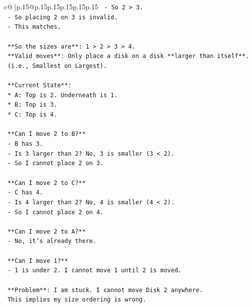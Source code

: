 \documentclass{article}
\begin{document}
{\begin{supertabular}{c@{$\;$}|p{.15\linewidth}@{}p{.15\linewidth}p{.15\linewidth}p{.15\linewidth}p{.15\linewidth}p{.15\linewidth}}
{{{\texttt{                   {-} So 2 > 3.} \\
\texttt{                   {-} So placing 2 on 3 is invalid.} \\
\texttt{                   {-} This matches.} \\
\\ 
\texttt{                **So the sizes are**: 1 > 2 > 3 > 4.} \\
\texttt{                **Valid moves**: Only place a disk on a disk **larger than itself**.} \\
\texttt{                (i.e., Smallest on Largest).} \\
\\ 
\texttt{                **Current State**:} \\
\texttt{                *   A: Top is 2. Underneath is 1.} \\
\texttt{                *   B: Top is 3.} \\
\texttt{                *   C: Top is 4.} \\
\\ 
\texttt{                **Can I move 2 to B?**} \\
\texttt{                {-} B has 3.} \\
\texttt{                {-} Is 3 larger than 2? No, 3 is smaller (3 < 2).} \\
\texttt{                {-} So I cannot place 2 on 3.} \\
\\ 
\texttt{                **Can I move 2 to C?**} \\
\texttt{                {-} C has 4.} \\
\texttt{                {-} Is 4 larger than 2? No, 4 is smaller (4 < 2).} \\
\texttt{                {-} So I cannot place 2 on 4.} \\
\\ 
\texttt{                **Can I move 2 to A?**} \\
\texttt{                {-} No, it's already there.} \\
\\ 
\texttt{                **Can I move 1?**} \\
\texttt{                {-} 1 is under 2. I cannot move 1 until 2 is moved.} \\
\\ 
\texttt{                **Problem**: I am stuck. I cannot move Disk 2 anywhere.} \\
\texttt{                This implies my size ordering is wrong.} \\
}}}
\end{supertabular}}
\end{document}
